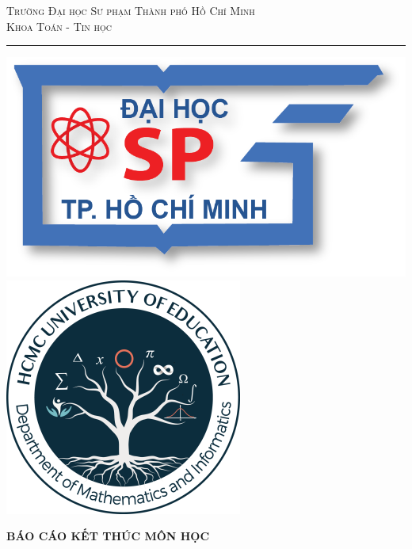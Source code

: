 \documentclass[a4paper,12pt,twosided]{report}
\begin{document}
\overfullrule=5mm %

\begin{titlepage}
\begin{center}
{\Large \scshape
Trường Đại học Sư phạm Thành phố Hồ Chí Minh\\
Khoa Toán - Tin học\\}

\rule{6cm}{1pt}

\vspace{1cm} %

\includegraphics[scale=0.2]{logo/logo.png}\hspace{1cm}
\includegraphics[scale=0.5]{logo/logokhoa.png}
\end{center}

\vspace{1cm}

\begin{center}
\begin{minipage}{\textwidth}
{\Large \bf BÁO CÁO KẾT THÚC MÔN HỌC}\\


\end{minipage}
\end{center}
\end{titlepage}
\end{document}
